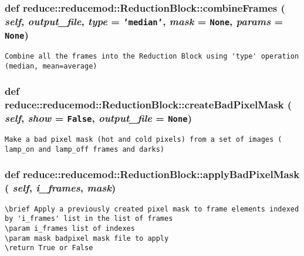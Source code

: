 \subsubsection{\setlength{\rightskip}{0pt plus 5cm}def reduce::reducemod::Reduction\-Block::combine\-Frames ( {\em self},  {\em output\_\-file},  {\em type} = {\tt 'median'},  {\em mask} = {\tt None},  {\em params} = {\tt None})}\label{classreduce_1_1reducemod_1_1ReductionBlock_11a1aaa23780a9017f9739d331d4e8ff}




\footnotesize\begin{verbatim}Combine all the frames into the Reduction Block using 'type' operation (median, mean=average)
\end{verbatim}
\normalsize
\subsubsection{\setlength{\rightskip}{0pt plus 5cm}def reduce::reducemod::Reduction\-Block::create\-Bad\-Pixel\-Mask ( {\em self},  {\em show} = {\tt False},  {\em output\_\-file} = {\tt None})}\label{classreduce_1_1reducemod_1_1ReductionBlock_68262e703addcaa662878441bd9d4f50}




\footnotesize\begin{verbatim}Make a bad pixel mask (hot and cold pixels) from a set of images ( lamp_on and lamp_off frames and darks)
\end{verbatim}
\normalsize
\subsubsection{\setlength{\rightskip}{0pt plus 5cm}def reduce::reducemod::Reduction\-Block::apply\-Bad\-Pixel\-Mask ( {\em self},  {\em i\_\-frames},  {\em mask})}\label{classreduce_1_1reducemod_1_1ReductionBlock_021bede3a6e946e92589e213de0a9cf7}




\footnotesize\begin{verbatim}
\brief Apply a previously created pixel mask to frame elements indexed by 'i_frames' list in the list of frames
\param i_frames list of indexes
\param mask badpixel mask file to apply
\return True or False
\end{verbatim}
\normalsize
